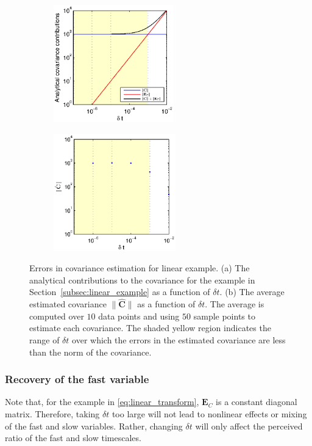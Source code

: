 \begin{figure}[t]
\centering
\begin{subfigure}{0.4\textwidth}
\centering
\includegraphics[height=2in]{C_dt_analytical_linear}
\caption{}
\end{subfigure}
%
\begin{subfigure}{0.4\textwidth}
\centering
\includegraphics[height=2in]{C_dt_linear}
\caption{}
\end{subfigure}
%
\caption[Errors in covariance estimation for linear multiscale example]{Errors in covariance estimation for linear example. (a) The analytical contributions to the covariance for the example in Section~\ref{subsec:linear_example} as a function of $\delta t$. (b) The average estimated covariance $\| \hat{ \mathbf{C}} \|$ as a function of $\delta t$. The average is computed over $10$ data points and using $50$ sample points to estimate each covariance. The shaded yellow region indicates the range of $\delta t$ over which the errors in the estimated covariance are less than the norm of the covariance. }
\label{fig:cov_error}
\end{figure}

\subsubsection{Recovery of the fast variable} \label{subsec:fastvar}

Note that, for the example in \eqref{eq:linear_transform}, $\mathbf{E}_C$ is a constant diagonal matrix.
%
Therefore, taking $\delta t$ too large will not lead to nonlinear effects or mixing of the fast and slow variables.
%
Rather, changing $\delta t$ will only affect the perceived ratio of the fast and slow timescales.

